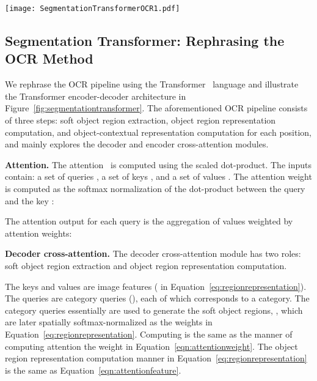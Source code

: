 \documentclass[runningheads]{llncs}
\begin{document}
{\color{darkgray}
\begin{figure*}[t]
\centering
    \texttt{[image: SegmentationTransformerOCR1.pdf]} 
    \caption{\small
    \textbf{Segmentation transformer}. Rephrasing the OCR pipeline showing
    in Figure~\ref{fig:ocr_pipeline} 
    using the Transformer encoder-decoder architecture.
    The encoder self-attention unit in the gray box could be a local version and 
    is optional
    and is useful for boosting the image features.
    The decoder self-attention unit serves as the role
    of interacting the category queries
    and can be discarded for a single decoder layer
    or moved after the decoder cross-attention unit.}
    \label{fig:segmentationtransformer}
\end{figure*}


\subsection{Segmentation Transformer: Rephrasing the OCR Method}
\label{sec:segmentationtransformer}
We rephrase the OCR pipeline using the Transformer~\cite{VaswaniSPUJGKP17} language
and illustrate the Transformer encoder-decoder architecture
in Figure~\ref{fig:segmentationtransformer}. 
The aforementioned OCR pipeline
consists of three steps:
soft object region extraction,
object region representation computation,
and object-contextual representation computation for each position,
and mainly explores
the decoder and encoder cross-attention modules.

\vspace{0.1cm}
\noindent\textbf{Attention.}
The attention~\cite{VaswaniSPUJGKP17}
is computed using
the scaled dot-product. 
The inputs contain:
a set of  queries ,
a set of  keys ,
and a set of  values .
The attention weight 
is computed as 
the softmax normalization of
the dot-product between the query  
and the key :

The attention output 
for each query  is the aggregation 
of values weighted by attention weights:


\vspace{0.1cm}
\noindent\textbf{Decoder cross-attention.}
The decoder cross-attention module has two roles:
soft object region extraction and
object region representation computation.

The keys and values are image features
( in Equation~\ref{eq:regionrepresentation}).
The queries are  category queries
(),
each of which corresponds to a category.
The  category queries essentially are used
to generate the soft object regions,
, 
which are later spatially softmax-normalized as the weights 
 in Equation~\ref{eq:regionrepresentation}. 
Computing 
is the same as the manner of computing 
attention the weight 
in Equation~\ref{eqn:attentionweight}.
The object region representation computation manner in Equation~\ref{eq:regionrepresentation}
is the same as Equation~\ref{eqn:attentionfeature}.

}
\end{document}
